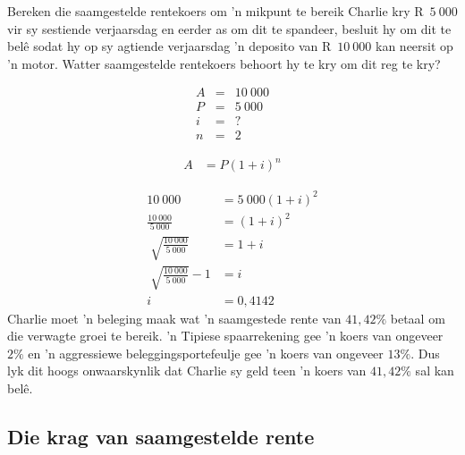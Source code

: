 \begin{wex}{Bereken die saamgestelde rentekoers om 'n mikpunt te bereik}
{Charlie kry R~$5~000$ vir sy sestiende verjaarsdag en eerder as om dit te spandeer, besluit hy om dit te bel\^e sodat hy op sy agtiende verjaarsdag 'n deposito van R~$10~000$ kan neersit op 'n motor. Watter saamgestelde rentekoers behoort hy te kry om dit reg te kry?}
{
    \begin{eqnarray*}
	A &=& 10~000\\
	P &=& 5~000\\
	i &=& ?\\
	n &=& 2
    \end{eqnarray*}

    \begin{align*}
	A &= P(1 + i)^n
    \end{align*}

    \begin{align*}
	10~000 &= 5~000(1 + i)^2\\
	\frac{10~000}{5~000}&= (1 +i)^2\\
	\sqrt[]{\frac{10~000}{5~000}} &= 1 + i\\
	\sqrt[]{\frac{10~000}{5~000}} - 1 &= i\\
	i &= 0,4142
    \end{align*}
Charlie moet 'n beleging maak wat 'n saamgestede rente van $41,42\%$ betaal om die  verwagte groei te bereik. 'n Tipiese spaarrekening gee 'n koers van ongeveer $2\%$ en 'n aggressiewe beleggingsportefeulje gee 'n koers van ongeveer $13\%$. Dus lyk dit hoogs onwaarskynlik dat Charlie sy geld teen 'n koers van $41,42\%$ sal kan bel\^e.
% 
} 
\end{wex}


\subsection{Die krag van saamgestelde rente}


